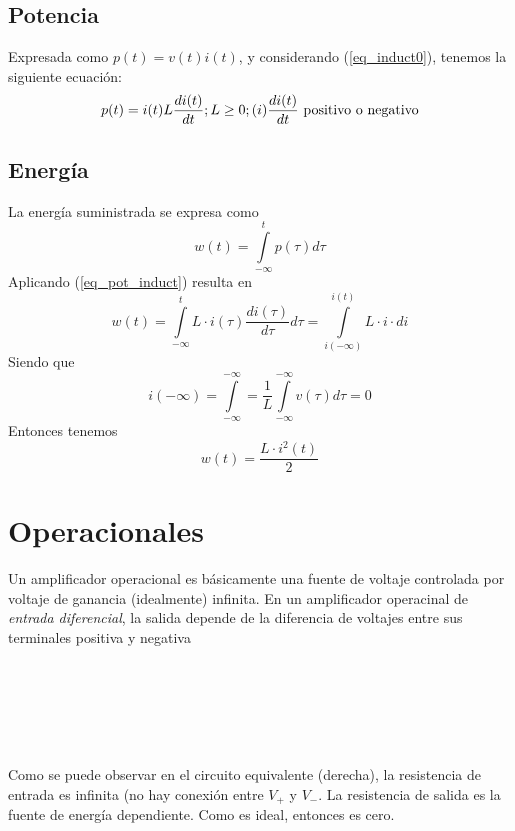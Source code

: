 \documentclass[12pt,spanish,lettersize]{article}
\begin{document}
\subsection{Potencia}
Expresada como $p(t)=v(t)i(t)$, y considerando (\ref{eq_induct0}), tenemos la siguiente ecuaci\'on:
\begin{equation}\label{eq_pot_induct}
p(t) = i(t)L\frac{di(t)}{dt}; L \geq 0 ; (i)\frac{di(t)}{dt} \textup{ positivo o negativo}
\end{equation}
\subsection{Energ\'ia}
La energ\'ia suministrada se expresa como
\begin{equation}\label{eq_ener_ind1}
w(t) = \int\limits_{-\infty}^{t}p(\tau)d\tau
\end{equation}
Aplicando (\ref{eq_pot_induct}) resulta en
\begin{equation}\label{eq_ener_indt2}
w(t) = \int\limits_{-\infty}^{t}L\cdot i(\tau)\frac{di(\tau)}{d\tau}d\tau = \int\limits_{i(-\infty)}^{i(t)}L\cdot i \cdot di
\end{equation}
Siendo que 
\begin{equation}
i(-\infty) = \int\limits_{-\infty}^{-\infty} = \frac{1}{L} \int\limits_{-\infty}^{-\infty}v(\tau)d\tau = 0
\end{equation}
Entonces tenemos
\begin{equation}\label{eq_ener_indf}
w(t) = \frac{L \cdot i^{2}(t)}{2}
\end{equation}
\section{Operacionales}
Un amplificador operacional es b\'asicamente una fuente de voltaje controlada por voltaje de ganancia (idealmente) infinita. En un amplificador operacinal de \emph{entrada diferencial}, la salida depende de la diferencia de voltajes entre sus terminales positiva y negativa
\\ \\ \\ \\ \\ \\ \\
Como se puede observar en el circuito equivalente (derecha), la resistencia de entrada es infinita (no hay conexi\'on entre $V_{+}$ y $V_{-}$. La resistencia de salida es la fuente de energ\'ia dependiente. Como es ideal, entonces es cero.
\end{document}
